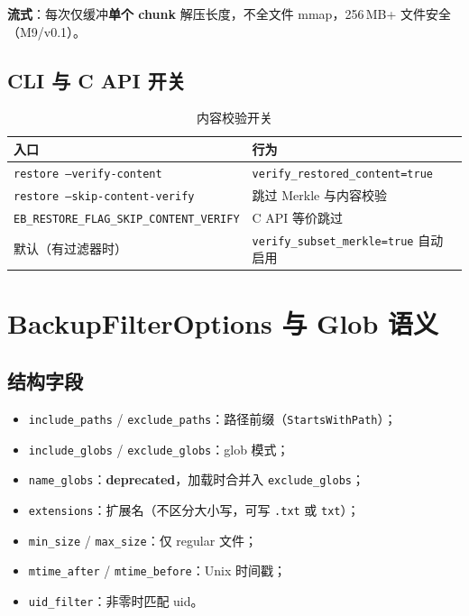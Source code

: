 \textbf{流式}：每次仅缓冲\textbf{单个 chunk} 解压长度，不全文件 mmap，256\,MB+ 文件安全（M9/v0.1）。

\subsection{CLI 与 C API 开关}

\begin{table}[htbp]
\centering
\caption{内容校验开关}
\begin{tabular}{@{}ll@{}}
\toprule
入口 & 行为 \\
\midrule
\texttt{restore --verify-content} & \texttt{verify\_restored\_content=true} \\
\texttt{restore --skip-content-verify} & 跳过 Merkle 与内容校验 \\
\texttt{EB\_RESTORE\_FLAG\_SKIP\_CONTENT\_VERIFY} & C API 等价跳过 \\
默认（有过滤器时） & \texttt{verify\_subset\_merkle=true} 自动启用 \\
\bottomrule
\end{tabular}
\end{table}

\section{BackupFilterOptions 与 Glob 语义}
\label{sec:filter-glob}

\subsection{结构字段}

\begin{structbox}[BackupFilterOptions]
\begin{itemize}[nosep]
  \item \texttt{include\_paths} / \texttt{exclude\_paths}：路径前缀（\texttt{StartsWithPath}）；
  \item \texttt{include\_globs} / \texttt{exclude\_globs}：glob 模式；
  \item \texttt{name\_globs}：\textbf{deprecated}，加载时合并入 \texttt{exclude\_globs}；
  \item \texttt{extensions}：扩展名（不区分大小写，可写 \texttt{.txt} 或 \texttt{txt}）；
  \item \texttt{min\_size} / \texttt{max\_size}：仅 regular 文件；
  \item \texttt{mtime\_after} / \texttt{mtime\_before}：Unix 时间戳；
  \item \texttt{uid\_filter}：非零时匹配 uid。
\end{itemize}
\end{structbox}

